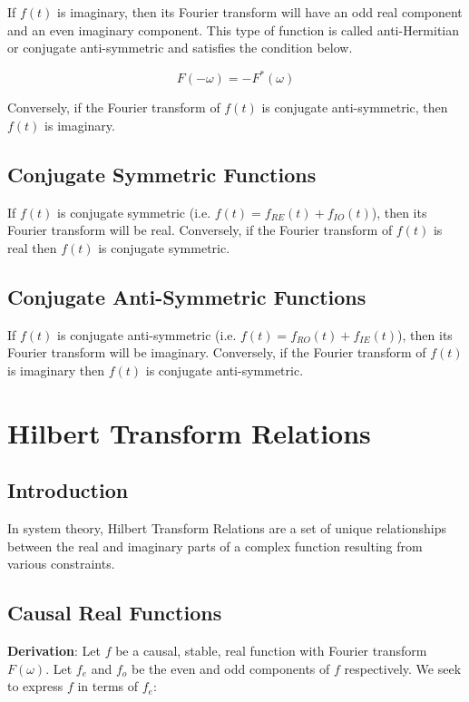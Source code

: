 If $f(t)$ is imaginary, then its Fourier transform will have an odd real component and an even imaginary component. This type of function is called anti-Hermitian or conjugate anti-symmetric and satisfies the condition below.

\begin{equation}
	F(-\omega) = -F^*(\omega)
\end{equation}

Conversely, if the Fourier transform of $f(t)$ is conjugate anti-symmetric, then $f(t)$ is imaginary.

\subsection{Conjugate Symmetric Functions}
If $f(t)$ is conjugate symmetric (i.e. $f(t) = f_{RE}(t) + f_{IO}(t)$), then its Fourier transform will be real. Conversely, if the Fourier transform of $f(t)$ is real then $f(t)$ is conjugate symmetric.

\subsection{Conjugate Anti-Symmetric Functions}
If $f(t)$ is conjugate anti-symmetric (i.e. $f(t) = f_{RO}(t) + f_{IE}(t)$), then its Fourier transform will be imaginary. Conversely, if the Fourier transform of $f(t)$ is imaginary then $f(t)$ is conjugate anti-symmetric.

\section{Hilbert Transform Relations}

\subsection{Introduction}
In system theory, Hilbert Transform Relations are a set of unique relationships between the real and imaginary parts of a complex function resulting from various constraints.

\subsection{Causal Real Functions}
\textbf{Derivation}: Let $f$ be a causal, stable, real function with Fourier transform $F(\omega)$. Let $f_e$ and $f_o$ be the even and odd components of $f$ respectively. We seek to express $f$ in terms of $f_e$:

